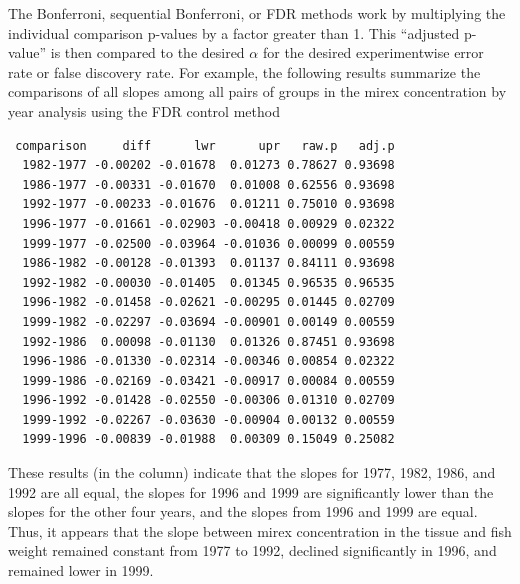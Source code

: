 \documentclass[10pt,openany]{book}\usepackage[]{graphicx}\usepackage[]{color}
\makeatletter
\newenvironment{kframe}{%
 \def\at@end@of@kframe{}%
 \ifinner\ifhmode%
  \def\at@end@of@kframe{\end{minipage}}%
  \begin{minipage}{\columnwidth}%
 \fi\fi%
 \def\FrameCommand##1{\hskip\@totalleftmargin \hskip-\fboxsep
 \colorbox{shadecolor}{##1}\hskip-\fboxsep
     \hskip-\linewidth \hskip-\@totalleftmargin \hskip\columnwidth}%
 \MakeFramed {\advance\hsize-\width
   \@totalleftmargin\z@ \linewidth\hsize
   \@setminipage}}%
 {\par\unskip\endMakeFramed%
 \at@end@of@kframe}
\newenvironment{knitrout}{}{} %
\makeatother
\begin{document}

\vspace{-12pt}

The Bonferroni, sequential Bonferroni, or FDR methods work by multiplying the individual comparison p-values by a factor greater than 1.  This ``adjusted p-value'' is then compared to the desired $\alpha$ for the desired experimentwise error rate or false discovery rate.  For example, the following results summarize the comparisons of all slopes among all pairs of groups in the mirex concentration by year analysis using the FDR control method

\begin{knitrout}
\color{fgcolor}\begin{kframe}
\begin{verbatim}
 comparison     diff      lwr      upr   raw.p   adj.p
  1982-1977 -0.00202 -0.01678  0.01273 0.78627 0.93698
  1986-1977 -0.00331 -0.01670  0.01008 0.62556 0.93698
  1992-1977 -0.00233 -0.01676  0.01211 0.75010 0.93698
  1996-1977 -0.01661 -0.02903 -0.00418 0.00929 0.02322
  1999-1977 -0.02500 -0.03964 -0.01036 0.00099 0.00559
  1986-1982 -0.00128 -0.01393  0.01137 0.84111 0.93698
  1992-1982 -0.00030 -0.01405  0.01345 0.96535 0.96535
  1996-1982 -0.01458 -0.02621 -0.00295 0.01445 0.02709
  1999-1982 -0.02297 -0.03694 -0.00901 0.00149 0.00559
  1992-1986  0.00098 -0.01130  0.01326 0.87451 0.93698
  1996-1986 -0.01330 -0.02314 -0.00346 0.00854 0.02322
  1999-1986 -0.02169 -0.03421 -0.00917 0.00084 0.00559
  1996-1992 -0.01428 -0.02550 -0.00306 0.01310 0.02709
  1999-1992 -0.02267 -0.03630 -0.00904 0.00132 0.00559
  1999-1996 -0.00839 -0.01988  0.00309 0.15049 0.25082
\end{verbatim}
\end{kframe}
\end{knitrout}

These results (in the  column) indicate that the slopes for 1977, 1982, 1986, and 1992 are all equal, the slopes for 1996 and 1999 are significantly lower than the slopes for the other four years, and the slopes from 1996 and 1999 are equal.  Thus, it appears that the slope between mirex concentration in the tissue and fish weight remained constant from 1977 to 1992, declined significantly in 1996, and remained lower in 1999.
\end{document}
